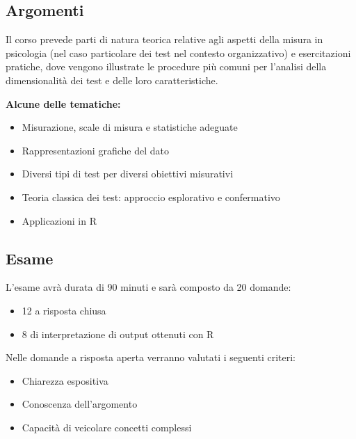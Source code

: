 \documentclass[compress]{beamer}
\begin{document}
\subsection*{Argomenti}
\begin{frame}

Il corso prevede parti di natura teorica relative agli aspetti della misura in psicologia (nel caso particolare dei test nel contesto organizzativo) e esercitazioni pratiche, dove vengono illustrate le procedure più comuni per l'analisi della dimensionalità dei test e delle loro caratteristiche.

\vspace{0.4cm}

\textbf{Alcune delle tematiche:}
\begin{itemize}
    \item Misurazione, scale di misura e statistiche adeguate
    \item Rappresentazioni grafiche del dato
    \item Diversi tipi di test per diversi obiettivi misurativi
    \item Teoria classica dei test: approccio esplorativo e confermativo
    \item Applicazioni in R
\end{itemize}

\end{frame}

\subsection*{Esame}
\begin{frame}

L'esame avrà durata di 90 minuti e sarà composto da 20 domande:
\begin{itemize}
    \item 12 a risposta chiusa
    \item 8 di interpretazione di output ottenuti con R
\end{itemize}

\vspace{0.4cm}

Nelle domande a risposta aperta verranno valutati i seguenti criteri:

\begin{itemize}
    \item Chiarezza espositiva
    \item Conoscenza dell'argomento
    \item Capacità di veicolare concetti complessi
\end{itemize}

\end{frame}
\end{document}
